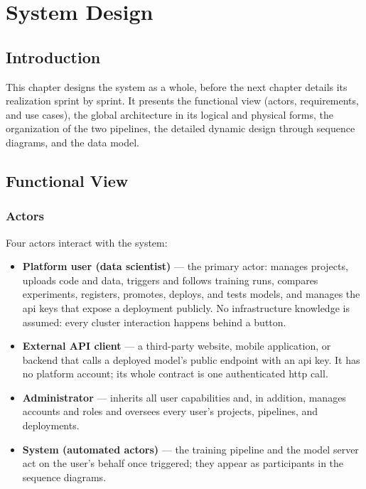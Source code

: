 \chapter{System Design}
\label{chap:requirements}
\label{chap:design}

\section{Introduction}
This chapter designs the system as a whole, before the next chapter details
its realization sprint by sprint. It presents the functional view (actors,
requirements, and use cases), the global architecture in its logical and
physical forms, the organization of the two pipelines, the detailed dynamic
design through sequence diagrams, and the data model.

\section{Functional View}
\label{sec:functional-view}

\subsection{Actors}
Four actors interact with the system:
\begin{itemize}[leftmargin=1.4em]
  \item \textbf{Platform user (data scientist)} --- the primary actor: manages
        projects, uploads code and data, triggers and follows training runs,
        compares experiments, registers, promotes, deploys, and tests models,
        and manages the \gls{api} keys that expose a deployment publicly. No
        infrastructure knowledge is assumed: every cluster interaction happens
        behind a button.
  \item \textbf{External API client} --- a third-party website, mobile
        application, or backend that calls a deployed model's public endpoint
        with an \gls{api} key. It has no platform account; its whole contract
        is one authenticated \gls{http} call.
  \item \textbf{Administrator} --- inherits all user capabilities and, in
        addition, manages accounts and roles and oversees every user's
        projects, pipelines, and deployments.
  \item \textbf{System (automated actors)} --- the training pipeline and the
        model server act on the user's behalf once triggered; they appear as
        participants in the sequence diagrams.
\end{itemize}

